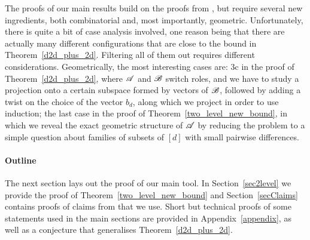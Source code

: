 The proofs of our main results build on the proofs from \cite{kupavskii22}, but require several new ingredients, both combinatorial and, most importantly, geometric. Unfortunately, there is quite a bit of case analysis involved, one reason being that there are actually many different configurations that are close to the bound in Theorem~\ref{d2d_plus_2d}. Filtering all of them out requires different considerations. Geometrically, the most interesting cases are: 3c in the proof of Theorem~\ref{d2d_plus_2d}, where ${\mathscr{A}}$ and ${\mathscr{B}}$ switch roles, and we have to study a projection onto a certain subspace formed by vectors of ${\mathscr{B}}$, followed by adding a twist on the choice of the vector $b_d$, along which we project in order to use induction; the last case in the proof of Theorem~\ref{two_level_new_bound}, in which we reveal the exact geometric structure of ${\mathscr{A}}$ by reducing the problem to a simple question about families of subsets of $[d]$ with small pairwise differences.  

\paragraph{Outline}
The next section lays out the proof of our main tool. In Section~\ref{sec2level} we provide the proof of Theorem~\ref{two_level_new_bound} and Section~\ref{secClaims} contains proofs of claims from \cite{kupavskii22} that we use. Short but technical proofs of some statements used in the main sections are provided in Appendix~\ref{appendix}, as well as a conjecture that generalises Theorem~\ref{d2d_plus_2d}.